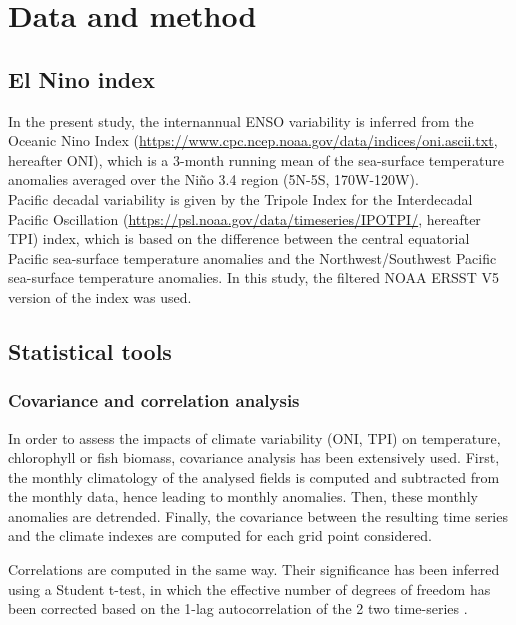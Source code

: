 \section{Data and method}

\subsection{El Nino index}
\label{sec:oni}

In the present study, the internannual ENSO variability is inferred from the Oceanic Nino Index (\url{https://www.cpc.ncep.noaa.gov/data/indices/oni.ascii.txt}, hereafter ONI), which is a 3-month running mean of the sea-surface temperature anomalies averaged over the Niño 3.4 region (5N-5S, 170W-120W).\\

Pacific decadal variability is given by the Tripole Index for the Interdecadal Pacific Oscillation (\url{https://psl.noaa.gov/data/timeseries/IPOTPI/}, hereafter TPI) index, which is based on the difference between the central equatorial Pacific sea-surface temperature anomalies and the Northwest/Southwest Pacific sea-surface temperature anomalies. In this study, the filtered NOAA ERSST V5 version of the index was used.

\subsection{Statistical tools}

\subsubsection{Covariance and correlation analysis}
\label{sec:cov}

In order to assess the impacts of climate variability (ONI, TPI) on temperature, chlorophyll or fish biomass, covariance analysis has been extensively used. First, the monthly climatology of the analysed fields is computed and subtracted from the monthly data, hence leading to monthly anomalies. Then, these monthly anomalies are detrended. Finally, the covariance between the resulting time series and the climate indexes are computed for each grid point considered. 

Correlations are computed in the same way. Their significance has been inferred using a Student t-test, in which the effective number of degrees of freedom has been corrected based on the 1-lag autocorrelation of the 2 two time-series \citep{brethertonEffectiveNumberSpatial1999}.

